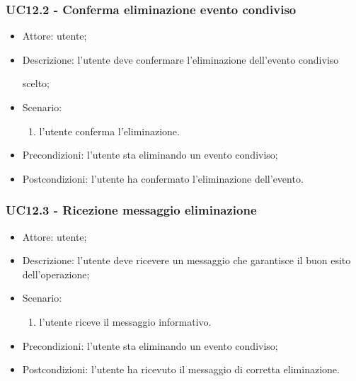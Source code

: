 \subsubsection{UC12.2 - Conferma eliminazione evento condiviso}
\begin{itemize}
    \item Attore: utente;
    \item Descrizione: l'utente deve confermare l'eliminazione dell'evento condiviso \par scelto;
    \item Scenario:
        \begin{enumerate}
        \item l'utente conferma l'eliminazione.
        \end{enumerate}
    
    \item Precondizioni: l'utente sta eliminando un evento condiviso;
    \item Postcondizioni: l'utente ha confermato l'eliminazione dell'evento.
\end{itemize}


\subsubsection{UC12.3 - Ricezione messaggio eliminazione}
\begin{itemize}
    \item Attore: utente;
    \item Descrizione: l'utente deve ricevere un messaggio che garantisce il buon esito dell'operazione;
    \item Scenario:
        \begin{enumerate}
        \item l'utente riceve il messaggio informativo.
        \end{enumerate}
    
    \item Precondizioni: l'utente sta eliminando un evento condiviso;
    \item Postcondizioni: l'utente ha ricevuto il messaggio di corretta eliminazione.
\end{itemize}





